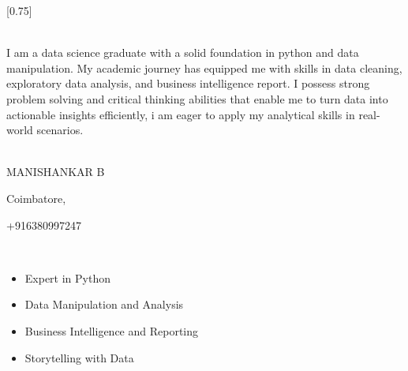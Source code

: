\documentclass[lighthipster]{simplehipstercv}
\begin{document}
\setlength{\columnsep}{1.5cm}
[0.75]
\begin{paracol}{2}

\paracolbackgroundoptions



\footnotesize
{\setasidefontcolour
\flushleft
\begin{center}
\end{center}

\\[0.5em]

{\footnotesize
I am a data science graduate with a solid foundation in python and data manipulation. My academic journey has equipped me with skills in data cleaning, exploratory data analysis, and business intelligence report. I possess strong problem solving and critical thinking abilities that enable me to turn data into actionable insights efficiently, i am eager to apply my analytical skills in real-world scenarios. }
\bigskip

 \\[0.5em]
MANISHANKAR B

Coimbatore,

+916380997247

\bigskip

 \\[0.5em]

\begin{itemize}
  \setlength{\leftmargin}{0pt} %
  \item Expert in Python
  \item Data Manipulation and Analysis
  \item Business Intelligence and Reporting
  \item Storytelling with Data
\end{itemize}

\bigskip



\vspace{4em}



}
\end{paracol}
\end{document}

